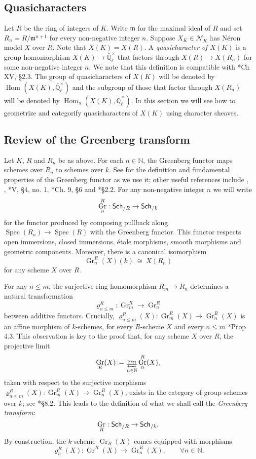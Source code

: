 \documentclass[10pt]{amsart}
\theoremstyle{plain}
\theoremstyle{definition}
\theoremstyle{remark}
\newcommand{\NN}{{\mathbb{N}}}
\newcommand{\EE}{\mathbb{\bar Q}_\ell}
\newcommand{\Fq}{k}
\newcommand{\EEx}{\EE^\times}
\newcommand{\m}{{\mathfrak{m}}}
\DeclareMathOperator{\Hom}{Hom}
\DeclareMathOperator{\Gr}{Gr}
\newcommand{\Spec}[1]{{\operatorname{Spec}(#1)}}
\newcommand{\ceq}{{\, :=\, }}
\newcommand{\iso}{{\ \cong\ }}
\newcommand{\catname}[1]{\normalfont{\textsf{#1}}}
\newcommand{\Sch}[1]{{\catname{Sch}_{/#1}}}
\begin{document}
\subsection{Quasicharacters}\label{ssec:quasicharacters}

Let $R$ be the ring of integers of $K$.
Write $\m$ for the maximal ideal of $R$ and set $R_n = R/\m^{n+1}$ for every non-negative integer $n$.
Suppose $X_K \in \mathcal{N}_K$ has N\'eron model $X$ over $R$.
Note that $X(K) = X(R)$.
A \emph{quasicharacter of $X(K)$} is a group homomorphism $X(K) \to \EEx$ that factors through $X(R) \to X(R_n)$ for some non-negative integer $n$.
We note that this definition is compatible with \cite{cassels-frohlich:AlgebraicNumberTheory}*{Ch XV, \S 2.3}.
The group of quasicharacters of $X(K)$ will be denoted by 
$\Hom_\text{}(X(K),\EEx)$
 and the subgroup of those that factor through $X(R_n)$ will be denoted by $\Hom_n(X(K),\EEx)$.
In this section we will see how to geometrize and categorify quasicharacters of $X(K)$ using character sheaves.

\subsection{Review of the Greenberg transform} \label{ssec:rev_Greenberg}

Let $K$, $R$ and $R_n$ be as above.
For each $n \in \NN$, the Greenberg functor maps schemes over $R_n$ to schemes over $\Fq$.
See \cite{bertrapelle-gonzales:Greenberg} for the definition and fundamental properties of the Greenberg functor as we use it; other useful references include
\cite{greenberg:61}, \cite{greenberg:63a},
\cite{demazure-gabriel:GroupesAlgebriques}*{V, \S 4, no. 1},
\cite{bosch-lutkebohmert-reynaud:NeronModels}*{Ch. 9, \S 6} and
\cite{nicaise-sebag:motivicSerre}*{\S 2.2}. %
%
For any non-negative integer $n$ we will write
\[
\Gr^R_n : \Sch{R} \to \Sch{\Fq}
\]
for the functor produced by composing pullback along $\Spec{R_n} \to \Spec{R}$ with the Greenberg functor. 
This functor respects open immersions, closed immersions, \'etale morphisms, smooth morphisms and geometric components.  Moreover, there is a canonical isomorphism
\[
\Gr^R_n(X)(\Fq) \iso X(R_n)
\]
for any scheme $X$ over $R$.

For any $n\leq m$,  the surjective ring homomorphism $R_{m} \to R_n$ determines a
natural transformation 
\[
\varrho^R_{n\leq m} : \Gr^R_{m} \to \Gr^R_n
\]
between additive functors.
Crucially, $\varrho^R_{n\leq m}(X): \Gr^R_{m}(X)\to \Gr^R_n(X)$ is an affine morphism of $\Fq$-schemes, for every $R$-scheme $X$ and every $n\leq m$ \cite{bertrapelle-gonzales:Greenberg}*{Prop 4.3}.
This observation is key to the proof that, for any scheme $X$ over $R$, the projective limit 
\[
\Gr_R(X) \ceq \varprojlim_{n\in \NN} \Gr^R_n(X),
\]
taken with respect to the surjective morphisms $\varrho^R_{n\leq m}(X) : \Gr^R_{m}(X) \to \Gr^R_n(X)$,
exists in the category of group schemes over $\Fq$;
see \cite{EGAIV3}*{\S 8.2}.
This leads to the definition of what we shall call the {\it Greenberg transform}:
\[
\Gr_R : \Sch{R} \to \Sch{\Fq}.
\]
By construction, the $\Fq$-scheme $\Gr_R(X)$ comes equipped with morphisms 
\[
\varrho^R_n(X) : \Gr^R(X) \to \Gr^R_n(X),\qquad \forall n\in \NN.
\]
\end{document}
